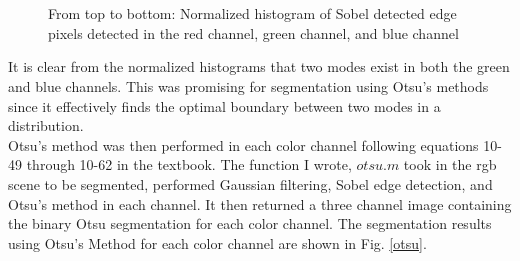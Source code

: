 \documentclass{article}[12 pt]
\begin{document}
\begin{figure}[H]
\captionsetup[subfloat]{labelformat=empty}
\centering
{} \\
 \\
\caption{From top to bottom: Normalized histogram of Sobel detected edge pixels detected in the red channel, green channel, and blue channel}
\label{hist}
\end{figure}

\noindent
It is clear from the normalized histograms that two modes exist in both the green and blue channels. This was promising for segmentation using Otsu's methods since it effectively finds the optimal boundary between two modes in a distribution. \\

\noindent
Otsu's method was then performed in each color channel following equations 10-49 through 10-62 in the textbook.  The function I wrote, $otsu.m$ took in the rgb scene to be segmented, performed Gaussian filtering, Sobel edge detection, and Otsu's method in each channel.  It then returned a three channel image containing the binary Otsu segmentation for each color channel. The segmentation results using Otsu's Method for each color channel are shown in Fig. \ref{otsu}.
\end{document}
